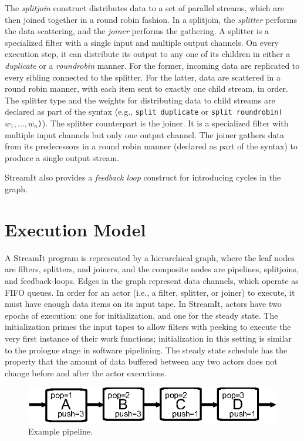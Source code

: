 The {\it splitjoin} construct distributes data to a set of parallel
streams, which are then joined together in a round robin fashion.  In
a splitjoin, the {\it splitter} performs the data scattering, and the
{\it joiner} performs the gathering. A splitter is a specialized
filter with a single input and  multiple output channels. On 
every execution step, it can distribute its output to any one of
its children in either a {\it duplicate} or a {\it roundrobin}
manner. For the former, incoming data are replicated to every
sibling connected to the splitter. For the latter, data are scattered
in a round robin manner, with each item sent to exactly one child
stream, in order.  The splitter type and the weights for distributing data to
child streams are declared as part of the syntax (e.g., \texttt{split
duplicate} or \texttt{split roundrobin($w_1,\ldots,w_n$)}). The
splitter counterpart is the joiner. It is a specialized filter with  
multiple input channels but only one output channel. The joiner
gathers data from its predecessors in a round robin manner (declared
as part of the syntax) to produce a single output stream.

StreamIt also provides a {\it feedback loop} construct for introducing
cycles in the graph.

\section{Execution Model}
\label{sec:execmodel}

A StreamIt program is represented by a hierarchical graph,
where the leaf nodes are filters, splitters, and joiners, and
the composite nodes are pipelines, splitjoins, and
feedback-loops. Edges in the graph represent data channels, which 
operate as FIFO queues.
In order for an actor  (i.e., a filter,
splitter, or joiner) to execute, it must have enough data items on its input
tape. In StreamIt, actors have  two epochs
of execution: one for initialization, and one for the steady
state. The initialization primes the input tapes to allow filters with
peeking to execute the very first instance of their work functions;
initialization in this setting is similar to the prologue stage in
software pipelining. The steady state schedule has the property that
the amount of data buffered between any two actors does not change
before and after the actor executions.

\begin{figure}[t]
\begin{center}
\vspace{24pt}
 \includegraphics[scale=1, angle=0]{./pipe-with-rates.eps}
\vspace{-6pt}
 \caption{Example pipeline.}
 \label{fig:pipe-with-rates}
\end{center}
\vspace{-12pt}
\end{figure}

